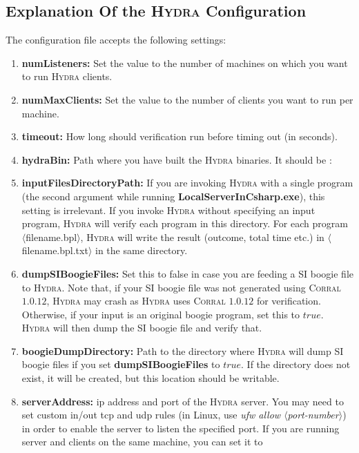 \documentclass{article}
\begin{document}
\subsection{Explanation Of the \textsc{Hydra} Configuration}
The configuration file accepts the following settings:
\begin{enumerate}
  \item \textbf{numListeners:} Set the value to the number of machines on which you want to run \textsc{Hydra} clients.
  \item \textbf{numMaxClients:} Set the value to the number of clients you want to run per machine.
  \item \textbf{timeout:} How long should verification run before timing out (in seconds).
  \item \textbf{hydraBin:} Path where you have built the \textsc{Hydra} binaries. It should be :
  \par
  \noindent
  \item \textbf{inputFilesDirectoryPath:} If you are invoking \textsc{Hydra} with a single program (the second argument while running \textbf{LocalServerInCsharp.exe}), this setting is irrelevant. If you invoke \textsc{Hydra} without specifying an input program, \textsc{Hydra} will verify each program in this directory. For each program  $\langle$filename.bpl$\rangle$, \textsc{Hydra} will write the result (outcome, total time etc.) in $\langle$filename.bpl.txt$\rangle$ in the same
      directory.
  \item \textbf{dumpSIBoogieFiles:} Set this to false in case you are feeding a SI boogie file to \textsc{Hydra}. Note that, if your SI boogie file was not generated using \textsc{Corral} $1.0.12$, \textsc{Hydra} may crash as \textsc{Hydra} uses \textsc{Corral} $1.0.12$ for verification. Otherwise, if your input is an original boogie program, set this to $true$. \textsc{Hydra} will then dump the SI boogie file and verify that.
  \item \textbf{boogieDumpDirectory:} Path to the directory where \textsc{Hydra} will dump SI boogie files if you set \textbf{dumpSIBoogieFiles} to $true$. If the directory does not exist, it will be created, but this location should be writable.
  \item \textbf{serverAddress:} ip address and port of the \textsc{Hydra} server. You may need to set custom in/out tcp and udp rules (in Linux, use \textit{ufw allow $\langle$port-number$\rangle$}) in order to enable the server to listen the specified port. If you are running server and clients on the same machine, you can set it to 

\end{enumerate}
\end{document}
